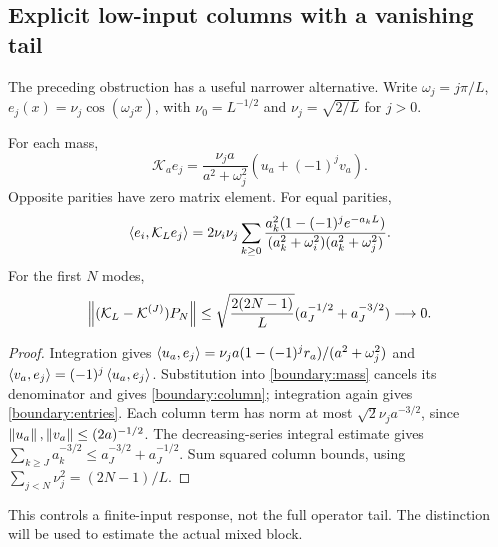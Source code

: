 \subsection{Explicit low-input columns with a vanishing tail}
The preceding obstruction has a useful narrower alternative.
Write $\omega_j=j\pi/L$, $e_j(x)=\nu_j\cos(\omega_jx)$, with
$\nu_0=L^{-1/2}$ and $\nu_j=\sqrt{2/L}$ for $j>0$.
\begin{proposition}\label{boundary:columns}
For each mass,
\begin{equation}\label{boundary:column}
\mathcal K_a e_j=
\frac{\nu_j a}{a^2+\omega_j^2}(u_a+(-1)^jv_a).
\end{equation}
Opposite parities have zero matrix element. For equal parities,
\begin{equation}\label{boundary:entries}
\left\langle e_i,\mathcal K_Le_j\right\rangle
=2\nu_i\nu_j\sum_{k\ge0}
\frac{a_k^2(1-(-1)^j e^{-a_kL})}
{(a_k^2+\omega_i^2)(a_k^2+\omega_j^2)}.
\end{equation}
For the first $N$ modes,
\begin{equation}\label{boundary:column-tail}
\left\lVert(\mathcal K_L-\mathcal K^{(J)})P_N\right\rVert
\le\sqrt{\frac{2(2N-1)}L}
       (a_J^{-1/2}+a_J^{-3/2})\longrightarrow0.
\end{equation}
\end{proposition}
\begin{proof}
Integration gives
$\left\langle u_a,e_j\right\rangle=\nu_ja(1-(-1)^jr_a)/(a^2+\omega_j^2)$ and
$\left\langle v_a,e_j\right\rangle=(-1)^j\left\langle u_a,e_j\right\rangle$.
Substitution into \eqref{boundary:mass} cancels its denominator
and gives \eqref{boundary:column}; integration again gives
\eqref{boundary:entries}.
Each column term has norm at most $\sqrt2\nu_ja^{-3/2}$, since
$\left\lVert u_a\right\rVert,\left\lVert v_a\right\rVert\le(2a)^{-1/2}$.
The decreasing-series integral estimate gives
$\sum_{k\ge J}a_k^{-3/2}\le a_J^{-3/2}+a_J^{-1/2}$.
Sum squared column bounds, using
$\sum_{j<N}\nu_j^2=(2N-1)/L$.
\end{proof}
This controls a finite-input response, not the full operator tail.
The distinction will be used to estimate the actual mixed block.
